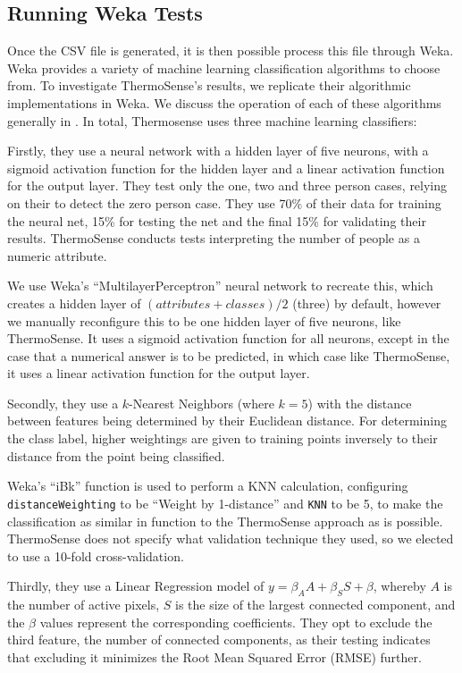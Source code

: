 \documentclass[../thesis/thesis.tex]{subfiles}
\begin{document}
\subsection{Running Weka Tests}
Once the CSV file is generated, it is then possible process this file through Weka. Weka provides a variety of machine learning classification algorithms to choose from. To investigate ThermoSense's results, we replicate their algorithmic implementations in Weka. We discuss the operation of each of these algorithms generally in . In total, Thermosense uses three machine learning classifiers:

Firstly, they use a neural network with a hidden layer of five neurons, with a sigmoid activation function for the hidden layer and a linear activation function for the output layer. They test only the one, two and three person cases, relying on their \pir to detect the zero person case. They use 70\% of their data for training the neural net, 15\% for testing the net and the final 15\% for validating their results. ThermoSense conducts tests interpreting the number of people as a numeric attribute.

We use Weka's ``MultilayerPerceptron'' neural network to recreate this, which creates a hidden layer of $(\mathit{attributes} + \mathit{classes}) / 2$ (three) by default, however we manually reconfigure this to be one hidden layer of five neurons, like ThermoSense. It uses a sigmoid activation function for all neurons, except in the case that a numerical answer is to be predicted, in which case like ThermoSense, it uses a linear activation function for the output layer.

Secondly, they use a $k$-Nearest Neighbors (where $k=5$) with the distance between features being determined by their Euclidean distance. For determining the class label, higher weightings are given to training points inversely to their distance from the point being classified.

Weka's ``iBk'' function is used to perform a KNN calculation, configuring \texttt{distanceWeighting} to be ``Weight by 1-distance'' and \texttt{KNN} to be 5, to make the classification as similar in function to the ThermoSense approach as is possible. ThermoSense does not specify what validation technique they used, so we elected to use a 10-fold cross-validation.

Thirdly, they use a Linear Regression model of $y = \beta_A A + \beta_S S + \beta $, whereby $A$ is the number of active pixels, $S$ is the size of the largest connected component, and the $\beta$ values represent the corresponding coefficients. They opt to exclude the third feature, the number of connected components, as their testing indicates that excluding it minimizes the Root Mean Squared Error (RMSE) further. 
\end{document}
